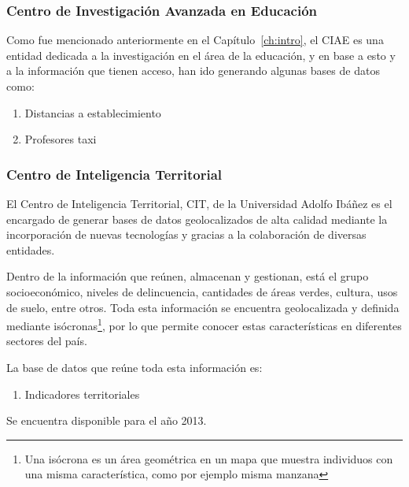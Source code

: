 \subsubsection{Centro de Investigación Avanzada en Educación}
Como fue mencionado anteriormente en el Capítulo~\ref{ch:intro}, el CIAE es una entidad dedicada a la investigación en el área de la educación, y en base a esto y a la información que tienen acceso, han ido generando algunas bases de datos como:

\begin{enumerate}
\item Distancias a establecimiento
\item Profesores taxi
\end{enumerate}

\subsubsection{Centro de Inteligencia Territorial}
El Centro de Inteligencia Territorial, CIT, de la Universidad Adolfo Ibáñez es el encargado de generar bases de datos geolocalizados de alta calidad mediante la incorporación de nuevas tecnologías y gracias a la colaboración de diversas entidades. 

Dentro de la información que reúnen, almacenan y gestionan, está el grupo socioeconómico, niveles de delincuencia, cantidades de áreas verdes, cultura, usos de suelo, entre otros. Toda esta información se encuentra geolocalizada y definida mediante isócronas\footnote{Una isócrona es un área geométrica en un mapa que muestra individuos con una misma característica, como por ejemplo misma manzana}, por lo que permite conocer estas características en diferentes sectores del país.

La base de datos que reúne toda esta información es:
\begin{enumerate}
\item Indicadores territoriales
\end{enumerate}

Se encuentra disponible para el año 2013. 


